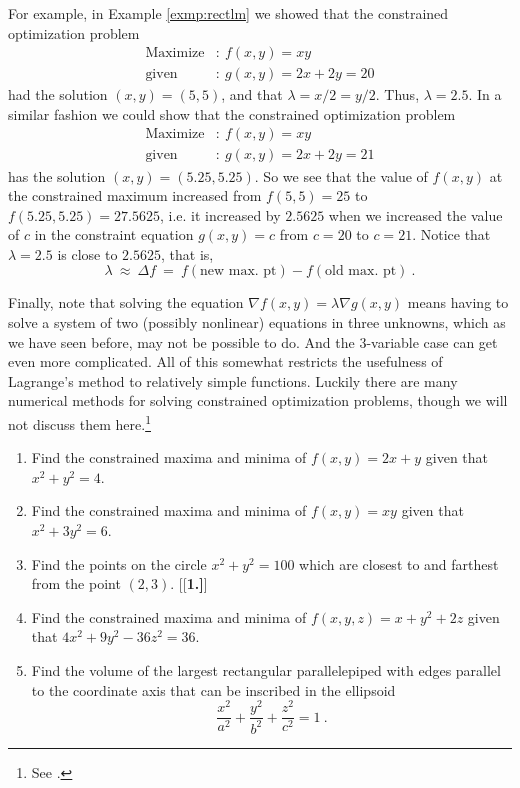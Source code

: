 For example, in Example \ref{exmp:rectlm} we showed that the constrained optimization problem
\begin{align*}
  \text{Maximize}&: ~ f(x,y) = xy\\
  \text{given}&: ~ g(x,y) = 2x + 2y = 20
\end{align*}
had the solution $(x,y) = (5,5)$, and that $\lambda = x/2 = y/2$. Thus, $\lambda = 2.5$. In a similar fashion we could
show that the constrained optimization problem
\begin{align*}
  \text{Maximize}&: ~ f(x,y) = xy\\
  \text{given}&: ~ g(x,y) = 2x + 2y = 21
\end{align*}
has the solution $(x,y) = (5.25,5.25)$. So we see that the value of $f(x,y)$ at the constrained maximum increased from
$f(5,5)=25$ to $f(5.25,5.25)=27.5625$, i.e. it increased by $2.5625$ when we increased the value of $c$ in the constraint
equation $g(x,y)=c$ from $c=20$ to $c=21$. Notice that $\lambda = 2.5$ is close to $2.5625$, that is,
\begin{displaymath}
 \lambda ~\approx~ \Delta f ~=~ f(\text{new max. pt}) - f(\text{old max. pt}) ~.
\end{displaymath}


Finally, note that
solving the equation $\nabla f(x,y) = \lambda \nabla g(x,y)$ means having to solve a system of two (possibly
nonlinear) equations in three unknowns, which as we have seen before, may not be possible to do. And the
3-variable case can get even more complicated. All of this somewhat
restricts the usefulness of Lagrange's method to relatively simple functions. Luckily there are many numerical methods
for solving constrained optimization problems, though we will not discuss them here.\footnote{See \cite{bss}.}

\startexercises\label{sec2dot7}
\begin{enumerate}[\bfseries 1.]
 \item Find the constrained maxima and minima of $f(x,y) = 2x+y$ given that $x^2 + y^2 =4$.
 \item Find the constrained maxima and minima of $f(x,y) = xy$ given that $x^2 + 3y^2 =6$.
 \item Find the points on the circle $x^2 + y^2 = 100$ which are closest to and farthest from the point $(2,3)$.
[{[\bfseries 1.]}]
 \item Find the constrained maxima and minima of $f(x,y,z) = x+y^2 +2z$ given that $4x^2 + 9y^2 -36z^2 =36$.
 \item Find the volume of the largest rectangular parallelepiped with edges parallel to the coordinate axis that can be inscribed in the ellipsoid
  \begin{displaymath}
   \frac{x^2}{a^2} + \frac{y^2}{b^2} + \frac{z^2}{c^2} = 1 ~.
  \end{displaymath}
\end{enumerate}
